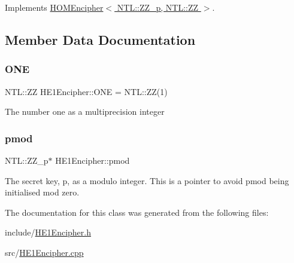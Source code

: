 Implements \hyperlink{classHOMEncipher_abf176e3fb85de6f0f6a2c96563397d39}{H\+O\+M\+Encipher$<$ N\+T\+L\+::\+Z\+Z\+\_\+p, N\+T\+L\+::\+Z\+Z $>$}.



\subsection{Member Data Documentation}
\mbox{\label{classHE1Encipher_a9c4f95a1461ec32d6e96db7c67aabdf3}} 
\subsubsection{\texorpdfstring{O\+NE}{ONE}}
{\footnotesize\ttfamily N\+T\+L\+::\+ZZ H\+E1\+Encipher\+::\+O\+NE = N\+T\+L\+::\+ZZ(1)\hspace{0.3cm}{\ttfamily [static]}}

The number one as a multiprecision integer \mbox{\label{classHE1Encipher_a4fa8ff49fc93cf01a0814aa83141e725}} 
\subsubsection{\texorpdfstring{pmod}{pmod}}
{\footnotesize\ttfamily N\+T\+L\+::\+Z\+Z\+\_\+p$\ast$ H\+E1\+Encipher\+::pmod\hspace{0.3cm}{\ttfamily [protected]}}

The secret key, {\ttfamily p}, as a modulo integer. This is a pointer to avoid pmod being initialised mod zero. 

The documentation for this class was generated from the following files\+:\begin{DoxyCompactItemize}
\item 
include/\hyperlink{HE1Encipher_8h}{H\+E1\+Encipher.\+h}\item 
src/\hyperlink{HE1Encipher_8cpp}{H\+E1\+Encipher.\+cpp}\end{DoxyCompactItemize}
